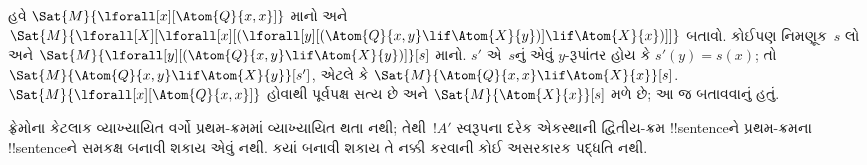 \documentclass[../../../include/open-logic-section]{subfiles}
\begin{document}
હવે $\Sat{M}{\lforall[x][\Atom{Q}{x,x}]}$ માનો
અને $\Sat{M}{\lforall[X][\lforall[x][(\lforall[y][(\Atom{Q}{x,y} \lif
        \Atom{X}{y})] \lif \Atom{X}{x})]]}$ બતાવો.
કોઈપણ નિમણૂક~$s$ લો અને
$\Sat{M}{\lforall[y][(\Atom{Q}{x,y} \lif
    \Atom{X}{y})]}[s]$ માનો. $s'$ એ~$s$નું એવું
$y$-રૂપાંતર હોય કે $s'(y)
= s(x)$; તો $\Sat{M}{\Atom{Q}{x,y} \lif \Atom{X}{y}}[s']$,
એટલે કે $\Sat{M}{\Atom{Q}{x,x} \lif \Atom{X}{x}}[s]$.
$\Sat{M}{\lforall[x][\Atom{Q}{x,x}]}$ હોવાથી
પૂર્વપક્ષ સત્ય છે અને $\Sat{M}{\Atom{X}{x}}[s]$
મળે છે; આ જ બતાવવાનું હતું.

ફ્રેમોના કેટલાક વ્યાખ્યાયિત વર્ગો પ્રથમ-ક્રમમાં
વ્યાખ્યાયિત થતા નથી; તેથી~$!A'$ સ્વરૂપના દરેક
એકસ્થાની દ્વિતીય-ક્રમ !!{sentence}ને પ્રથમ-ક્રમના
!!{sentence}ને સમકક્ષ બનાવી શકાય એવું નથી.
કયાં બનાવી શકાય તે નક્કી કરવાની કોઈ અસરકારક
પદ્ધતિ નથી.
\end{document}
